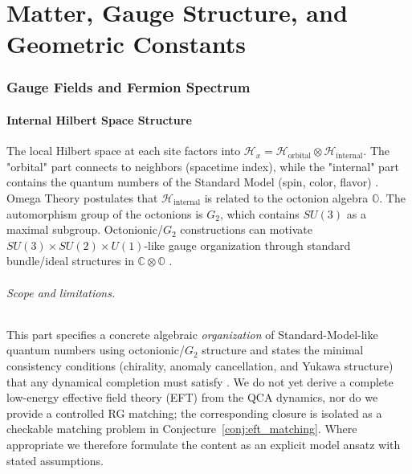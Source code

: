 \part{Matter, Gauge Structure, and Geometric Constants}
\label{part:IV}

\section{Gauge Fields and Fermion Spectrum}
\label{chap:gauge_fields}

\subsection{Internal Hilbert Space Structure}
The local Hilbert space at each site factors into $\mathcal{H}_x = \mathcal{H}_{\text{orbital}} \otimes \mathcal{H}_{\text{internal}}$. The "orbital" part connects to neighbors (spacetime index), while the "internal" part contains the quantum numbers of the Standard Model (spin, color, flavor) \cite{PeskinSchroeder1995}.
Omega Theory postulates that $\mathcal{H}_{\text{internal}}$ is related to the octonion algebra $\mathbb{O}$. The automorphism group of the octonions is $G_2$, which contains $SU(3)$ as a maximal subgroup. Octonionic/$G_2$ constructions can motivate $SU(3)\times SU(2)\times U(1)$-like gauge organization through standard bundle/ideal structures in $\mathbb{C}\otimes\mathbb{O}$ \cite{Baez2002, Furey2017}.
\paragraph{Scope and limitations.}
This part specifies a concrete algebraic \emph{organization} of Standard-Model-like quantum numbers using octonionic/$G_2$ structure and states the minimal consistency conditions (chirality, anomaly cancellation, and Yukawa structure) that any dynamical completion must satisfy \cite{Baez2002,Furey2017,PeskinSchroeder1995}. We do not yet derive a complete low-energy effective field theory (EFT) from the QCA dynamics, nor do we provide a controlled RG matching; the corresponding closure is isolated as a checkable matching problem in Conjecture~\ref{conj:eft_matching}. Where appropriate we therefore formulate the content as an explicit model ansatz with stated assumptions.

